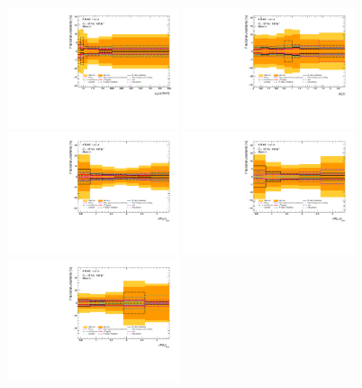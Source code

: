 \begin{figure}[ht]
  \centering
  \includegraphics[width=0.45\textwidth]{figures/diff_xsec/groupedimpact-absolute-xsec//tty_prod_DL/Uncertainty_tty_pt.pdf}%
  \includegraphics[width=0.45\textwidth]{figures/diff_xsec/groupedimpact-absolute-xsec//tty_prod_DL/Uncertainty_tty_eta.pdf}\\%
  \includegraphics[width=0.45\textwidth]{figures/diff_xsec/groupedimpact-absolute-xsec//tty_prod_DL/Uncertainty_tty_min_drphl.pdf} %
  \includegraphics[width=0.45\textwidth]{figures/diff_xsec/groupedimpact-absolute-xsec//tty_prod_DL/Uncertainty_tty_drphb.pdf}\\%
  \includegraphics[width=0.45\textwidth]{figures/diff_xsec/groupedimpact-absolute-xsec//tty_prod_DL/Uncertainty_tty_drlj.pdf}%

\end{figure}

